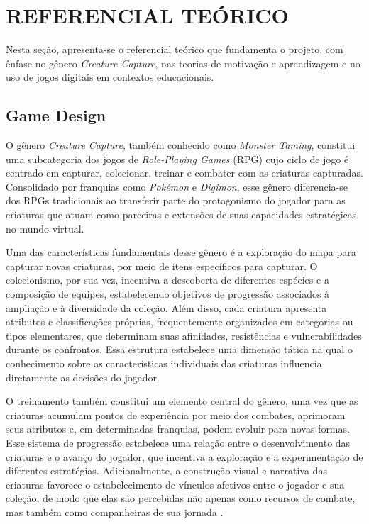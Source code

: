 \section{REFERENCIAL TEÓRICO}
Nesta seção, apresenta-se o referencial teórico que fundamenta o projeto, com ênfase no gênero \textit{Creature Capture}, nas teorias de motivação e aprendizagem e no uso de jogos digitais em contextos educacionais.

\subsection{Game Design}
O gênero \textit{Creature Capture}, também conhecido como \textit{Monster Taming}, constitui uma subcategoria dos jogos de \textit{Role-Playing Games} (RPG) cujo ciclo de jogo é centrado em capturar, colecionar, treinar e combater com as criaturas capturadas. Consolidado por franquias como \textit{Pokémon} e \textit{Digimon}, esse gênero diferencia-se dos RPGs tradicionais ao transferir parte do protagonismo do jogador para as criaturas que atuam como parceiras e extensões de suas capacidades estratégicas no mundo virtual.

Uma das características fundamentais desse gênero é a exploração do mapa para capturar novas criaturas, por meio de itens específicos para capturar. O colecionismo, por sua vez, incentiva a descoberta de diferentes espécies e a composição de equipes, estabelecendo objetivos de progressão associados à ampliação e à diversidade da coleção. Além disso, cada criatura apresenta atributos e classificações próprias, frequentemente organizados em categorias ou tipos elementares, que determinam suas afinidades, resistências e vulnerabilidades durante os confrontos. Essa estrutura estabelece uma dimensão tática na qual o conhecimento sobre as características individuais das criaturas influencia diretamente as decisões do jogador.

O treinamento também constitui um elemento central do gênero, uma vez que as criaturas acumulam pontos de experiência por meio dos combates, aprimoram seus atributos e, em determinadas franquias, podem evoluir para novas formas. Esse sistema de progressão estabelece uma relação entre o desenvolvimento das criaturas e o avanço do jogador, que incentiva a exploração e a experimentação de diferentes estratégias. Adicionalmente, a construção visual e narrativa das criaturas favorece o estabelecimento de vínculos afetivos entre o jogador e sua coleção, de modo que elas são percebidas não apenas como recursos de combate, mas também como companheiras de sua jornada \cite{sapach17}.

